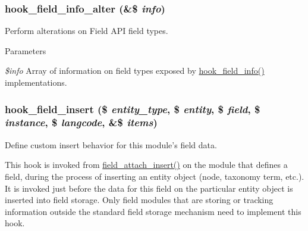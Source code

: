 \hypertarget{group__field__types_ga62d5e308d07e62b096d13714ae42335f}{
\subsubsection[{hook\_\-field\_\-info\_\-alter}]{\setlength{\rightskip}{0pt plus 5cm}hook\_\-field\_\-info\_\-alter (\&\$ {\em info})}}
\label{group__field__types_ga62d5e308d07e62b096d13714ae42335f}
Perform alterations on Field API field types.


\begin{DoxyParams}{Parameters}
\item[{\em \$info}]Array of information on field types exposed by \hyperlink{group__field__types_gad3eb779f26f41b520f19af011ece3eb1}{hook\_\-field\_\-info()} implementations. \end{DoxyParams}
\hypertarget{group__field__types_ga2d29ec2e4a47170d5aaaf41bdd4813df}{
\subsubsection[{hook\_\-field\_\-insert}]{\setlength{\rightskip}{0pt plus 5cm}hook\_\-field\_\-insert (\$ {\em entity\_\-type}, \/  \$ {\em entity}, \/  \$ {\em field}, \/  \$ {\em instance}, \/  \$ {\em langcode}, \/  \&\$ {\em items})}}
\label{group__field__types_ga2d29ec2e4a47170d5aaaf41bdd4813df}
Define custom insert behavior for this module's field data.

This hook is invoked from \hyperlink{group__field__attach_gad7c37d577b97db5e0c182bc570ed7cf4}{field\_\-attach\_\-insert()} on the module that defines a field, during the process of inserting an entity object (node, taxonomy term, etc.). It is invoked just before the data for this field on the particular entity object is inserted into field storage. Only field modules that are storing or tracking information outside the standard field storage mechanism need to implement this hook.


